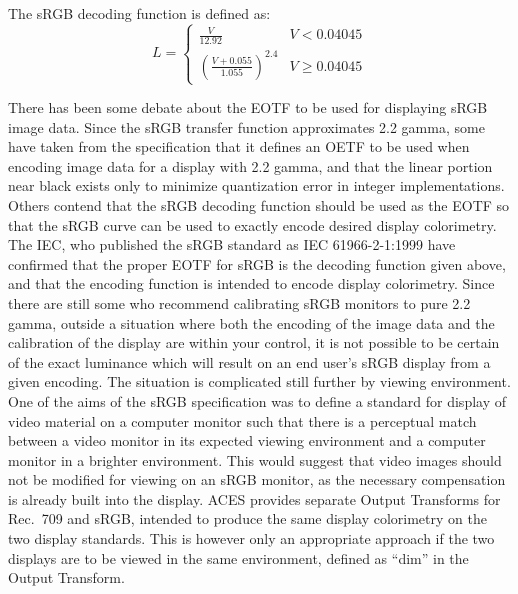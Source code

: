 The sRGB decoding function is defined as:
\begin{equation}
    L =
    \begin{cases}
        \frac{V}{12.92} & V < 0.04045 \\
        (\frac{V + 0.055}{1.055})^{2.4} & V \geq 0.04045
    \end{cases}
\end{equation}

There has been some debate about the EOTF to be used for displaying sRGB image data.
Since the sRGB transfer function approximates 2.2 gamma, some have taken from the specification that it defines an OETF to be used when encoding image data for a display with 2.2 gamma, and that the linear portion near black exists only to minimize quantization error in integer implementations.
Others contend that the sRGB decoding function should be used as the EOTF so that the sRGB curve can be used to exactly encode desired display colorimetry.
\ccPar{}
The IEC, who published the sRGB standard as IEC 61966-2-1:1999 \parencite{InternationalElectrotechnicalCommission1999a} have confirmed that the proper EOTF for sRGB is the decoding function given above, and that the encoding function is intended to encode display colorimetry.
\ccPar{}
Since there are still some who recommend calibrating sRGB monitors to pure 2.2 gamma, outside a situation where both the encoding of the image data and the calibration of the display are within your control, it is not possible to be certain of the exact luminance which will result on an end user's sRGB display from a given encoding.
\ccPar{}
The situation is complicated still further by viewing environment.
One of the aims of the sRGB specification was to define a standard for display of video material on a computer monitor such that there is a perceptual match between a video monitor in its expected viewing environment and a computer monitor in a brighter environment.
This would suggest that video images should not be modified for viewing on an sRGB monitor, as the necessary compensation is already built into the display.
ACES provides separate Output Transforms for Rec.~709 and sRGB, intended to produce the same display colorimetry on the two display standards.
This is however only an appropriate approach if the two displays are to be viewed in the same environment, defined as ``dim'' in the Output Transform.

\begin{figure}[H]
    \label{fig:srgb-eotf}
\end{figure}

